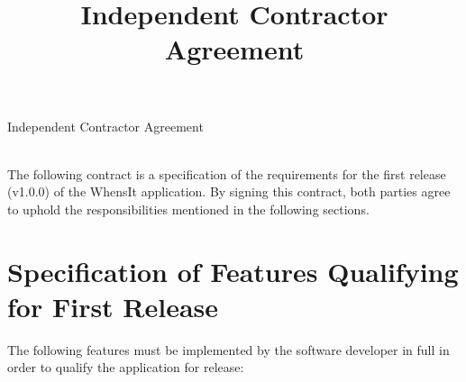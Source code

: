 \documentclass{article}
\title{Independent Contractor Agreement}
\date{}
\author{}
\begin{document}
\begin{center}
{\huge Independent Contractor Agreement}
\end{center}
\vspace{1cm}
\noindent\\
\indent The following contract is a specification of the requirements for the first release (v1.0.0) of the WhensIt application. By signing this contract, both parties agree to uphold the responsibilities mentioned in the following sections.
\section{Specification of Features Qualifying for First Release}
\indent The following features must be implemented by the software developer in full in order to qualify the application for release:
\end{document}
